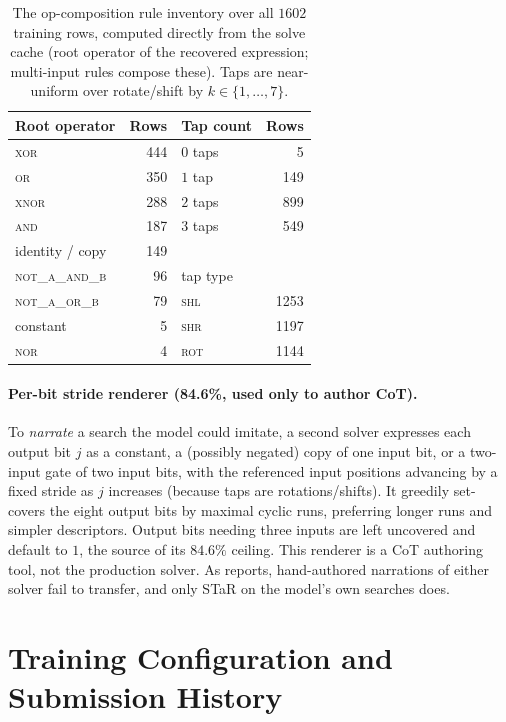 \documentclass[11pt]{article}
\begin{document}
\begin{table}[htbp]
\centering
\caption{The op-composition rule inventory over all $1602$ training rows, computed directly
from the solve cache (root operator of the recovered expression; multi-input rules compose
these). Taps are near-uniform over rotate/shift by $k\in\{1,\dots,7\}$.}
\label{tab:bitcache}
\small
\begin{tabular}{l r | l r}
\toprule
Root operator & Rows & Tap count & Rows \\
\midrule
\textsc{xor}          & 444 & $0$ taps & 5 \\
\textsc{or}           & 350 & $1$ tap  & 149 \\
\textsc{xnor}         & 288 & $2$ taps & 899 \\
\textsc{and}          & 187 & $3$ taps & 549 \\
identity / copy       & 149 & & \\
\textsc{not\_a\_and\_b} & 96 & tap type & \\
\textsc{not\_a\_or\_b}  & 79 & \textsc{shl} & 1253 \\
constant              & 5   & \textsc{shr} & 1197 \\
\textsc{nor}          & 4   & \textsc{rot} & 1144 \\
\bottomrule
\end{tabular}
\end{table}

\paragraph{Per-bit stride renderer (84.6\%, used only to author CoT).} To \emph{narrate} a
search the model could imitate, a second solver expresses each output bit $j$ as a constant,
a (possibly negated) copy of one input bit, or a two-input gate of two input bits, with the
referenced input positions advancing by a fixed stride as $j$ increases (because taps are
rotations/shifts). It greedily set-covers the eight output bits by maximal cyclic runs,
preferring longer runs and simpler descriptors. Output bits needing three inputs are left
uncovered and default to $1$, the source of its $84.6\%$ ceiling. This renderer is a CoT
authoring tool, not the production solver. As  reports, hand-authored
narrations of either solver fail to transfer, and only STaR on the model's own searches does.

\section{Training Configuration and Submission History}
\label{app:training}
\end{document}
